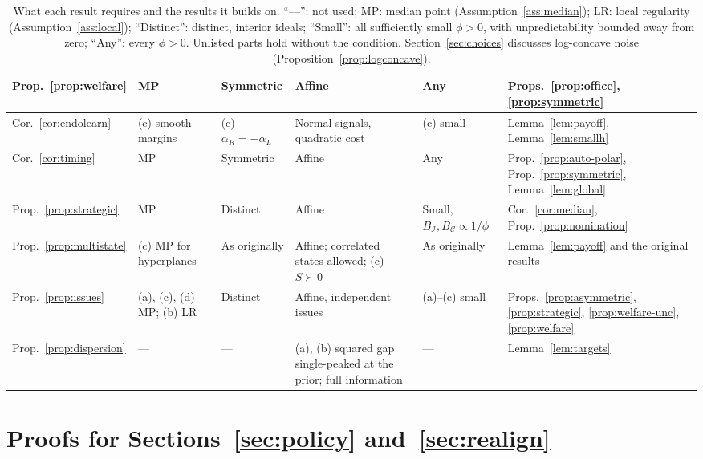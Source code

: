 \documentclass[12pt,letterpaper]{article}
\begin{document}
\begin{table}[p]
\begin{spacing}{1}
\begin{adjustbox}{max totalsize={\textwidth}{0.83\textheight},center}
\begin{tabular}{@{}L{3.6cm}L{2.6cm}L{2.2cm}L{2.5cm}L{1.9cm}L{3.2cm}@{}}
Prop.~\ref{prop:welfare} & MP & Symmetric & Affine & Any & Props.~\ref{prop:office}, \ref{prop:symmetric} \\ \midrule
Cor.~\ref{cor:endolearn} & (c) smooth margins & (c) $\alpha_R=-\alpha_L$ & Normal signals, quadratic cost & (c) small & Lemma~\ref{lem:payoff}, Lemma~\ref{lem:smallh} \\ \midrule
Cor.~\ref{cor:timing} & MP & Symmetric & Affine & Any & Prop.~\ref{prop:auto-polar}, Prop.~\ref{prop:symmetric}, Lemma~\ref{lem:global} \\ \midrule
Prop.~\ref{prop:strategic} & MP & Distinct & Affine & Small, $B_{\mathcal I},B_{\mathcal C}\propto1/\phi$ & Cor.~\ref{cor:median}, Prop.~\ref{prop:nomination} \\ \midrule
Prop.~\ref{prop:multistate} & (c) MP for hyperplanes & As originally & Affine; correlated states allowed; (c) $S\succ0$ & As originally & Lemma~\ref{lem:payoff} and the original results \\ \midrule
Prop.~\ref{prop:issues} & (a), (c), (d) MP; (b) LR & Distinct & Affine, independent issues & (a)--(c) small & Props.~\ref{prop:asymmetric}, \ref{prop:strategic}, \ref{prop:welfare-unc}, \ref{prop:welfare} \\ \midrule
Prop.~\ref{prop:dispersion} & --- & --- & (a), (b) squared gap single-peaked at the prior; full information & --- & Lemma~\ref{lem:targets} \\
\bottomrule
\end{tabular}
\end{adjustbox}
\caption{What each result requires and the results it builds on. ``---'': not used; MP: median point (Assumption~\ref{ass:median}); LR: local regularity (Assumption~\ref{ass:local}); ``Distinct'': distinct, interior ideals; ``Small'': all sufficiently small $\phi>0$, with unpredictability bounded away from zero; ``Any'': every $\phi>0$. Unlisted parts hold without the condition. Section~\ref{sec:choices} discusses log-concave noise (Proposition~\ref{prop:logconcave}).}
\label{tab:general}
\end{spacing}
\end{table}

\section{Proofs for Sections~\ref{sec:policy} and~\ref{sec:realign}}
\end{document}
